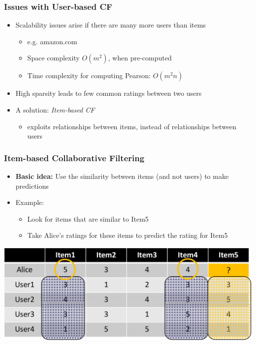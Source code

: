 \documentclass{beamer}
\begin{document}
\begin{frame}
    \frametitle{Issues with User-based CF}
    \begin{itemize}
    \item Scalability issues arise if there are many more users than items
        \begin{itemize}
        \item e.g. amazon.com
        \item Space complexity $O(m^2)$, when pre-computed
        \item Time complexity for computing Pearson: $O(m^2n)$
        \end{itemize}
    \item High sparsity leads to few common ratings between two users
    \item A solution: \emph{Item-based CF}
        \begin{itemize}
        \item exploits relationships between items, instead of relationships
            between users
        \end{itemize}
    \end{itemize}
\end{frame}

\begin{frame}
    \frametitle{Item-based Collaborative Filtering}
    \begin{itemize}
    \item \textbf{Basic idea:} Use the similarity between items (and not users)
        to make predictions
    \item Example:
        \begin{itemize}
        \item Look for items that are similar to Item5
        \item Take Alice's ratings for these items to predict the rating for
            Item5
        \end{itemize}
    \end{itemize}
    \hfill\includegraphics[width=.8\linewidth]{itemCF}\hfill~
\end{frame}
\end{document}
